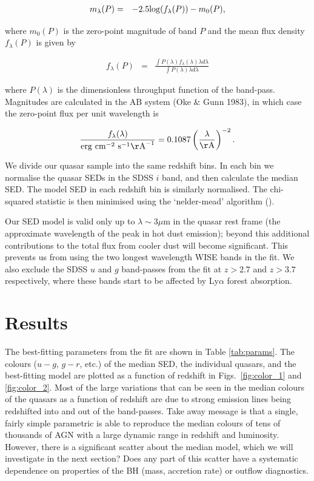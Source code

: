 \begin{eqnarray}
  m_\lambda(P) & = & -2.5{\rm log}(f_\lambda(P)) - m_0(P), 
\end{eqnarray}

where $m_0(P)$ is the zero-point magnitude of band $P$ and the mean flux density $f_{\lambda}(P)$ is given by 

\begin{eqnarray}
  \label{eq:flux}
  f_{\lambda}(P) & = & \frac{\int P(\lambda) f_\lambda(\lambda) \lambda d\lambda }{\int P(\lambda) \lambda d\lambda}
\end{eqnarray}

where $P(\lambda)$ is the dimensionless throughput function of the band-pass. 
Magnitudes are calculated in the AB system (Oke \& Gunn 1983), in which case the zero-point flux per unit wavelength is 

\begin{eqnarray}
  \frac{f_\lambda(\lambda)}{{\rm erg}~{\rm cm}^{-2}~{\rm s}^{-1} {\rm\AA}^{-1}} = 0.1087 \left(\frac{\lambda}{\rm \AA}\right)^{-2}.
\end{eqnarray}


We divide our quasar sample into the same redshift bins.
In each bin we normalise the quasar \ac{SED}s in the SDSS $i$ band, and then calculate the median \ac{SED}. 
The model \ac{SED} in each redshift bin is similarly normalised. 
The chi-squared statistic is then minimised using the `nelder-mead' algorithm (). 

Our \ac{SED} model is valid only up to $\lambda \sim 3\mu$m in the quasar rest frame (the approximate wavelength of the peak in hot dust emission); beyond this additional contributions to the total flux from cooler dust will become significant. 
This prevents us from using the two longest wavelength WISE bands in the fit. 
We also exclude the SDSS $u$ and $g$ band-passes from the fit at $z > 2.7$ and $z > 3.7$ respectively, where these bands start to be affected by Ly$\alpha$ forest absorption.

\section{Results}

The best-fitting parameters from the fit are shown in Table \ref{tab:params}. 
The colours ($u - g$, $g - r$, etc.) of the median \ac{SED}, the individual quasars, and the best-fitting model are plotted as a function of redshift in Figs.~\ref{fig:color_1} and \ref{fig:color_2}.
Most of the large variations that can be seen in the median colours of the quasars as a function of redshift are due to strong emission lines being redshifted into and out of the band-passes.
Take away message is that a single, fairly simple parametric is able to reproduce the median colours of tens of thousands of \ac{AGN} with a large dynamic range in redshift and luminosity. 
However, there is a significant scatter about the median model, which we will investigate in the next section?
Does any part of this scatter have a systematic dependence on properties of the BH (mass, accretion rate) or outflow diagnostics.  

